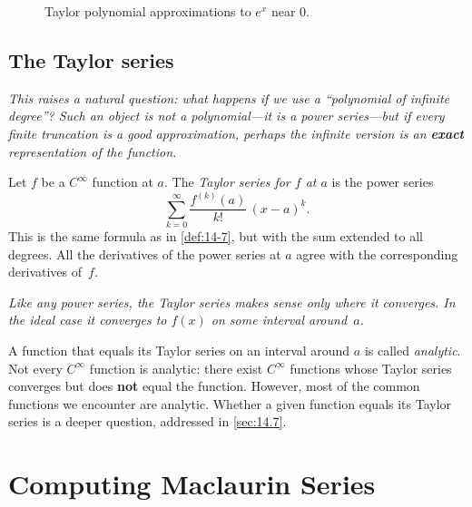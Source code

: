 \begin{figure}[ht]
  \centering
  
  \caption{Taylor polynomial approximations to $e^x$ near $0$.}
  \label{fig:taylor-approx-exp}
\end{figure}

\subsection*{The Taylor series}

\textit{This raises a natural question: what happens if we use a ``polynomial of infinite degree''?  Such an object is not a polynomial---it is a power series---but if every finite truncation is a good approximation, perhaps the infinite version is an \textbf{exact} representation of the function.}

\begin{definition}
\label{def:14-8}
Let $f$ be a $C^{\infty}$ function at $a$.  The \emph{Taylor series for $f$ at $a$} is the power series
\[
  \sum_{k=0}^{\infty}\frac{f^{(k)}(a)}{k!}\,(x-a)^{k}.
\]
This is the same formula as in \cref{def:14-7}, but with the sum extended to all degrees.  All the derivatives of the power series at $a$ agree with the corresponding derivatives of~$f$.
\end{definition}

\textit{Like any power series, the Taylor series makes sense only where it converges.  In the ideal case it converges to $f(x)$ on some interval around~$a$.}

\begin{remark}[Warning]
A function that equals its Taylor series on an interval around $a$ is called \emph{analytic}.  Not every $C^{\infty}$ function is analytic: there exist $C^{\infty}$ functions whose Taylor series converges but does \textbf{not} equal the function.  However, most of the common functions we encounter are analytic.  Whether a given function equals its Taylor series is a deeper question, addressed in \cref{sec:14.7}.
\end{remark}

\section{Computing Maclaurin Series}
\label{sec:14.6}

